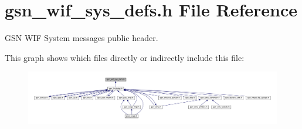 \hypertarget{a00612}{
\section{gsn\_\-wif\_\-sys\_\-defs.h File Reference}
\label{a00612}
}


GSN WIF System messages public header.  


This graph shows which files directly or indirectly include this file:
\nopagebreak
\begin{figure}[H]
\begin{center}
\leavevmode
\includegraphics[width=400pt]{a00859}
\end{center}
\end{figure}
